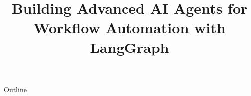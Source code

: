 \documentclass[xcolor=dvipsnames,compress,t,pdf,9pt]{beamer}
\title[\insertframenumber /\inserttotalframenumber]{Building Advanced AI Agents for Workflow Automation with LangGraph}
\begin{document}
	\begin{frame}
	\titlepage
	\end{frame}
	
	\begin{frame}{Outline}
	    \tableofcontents
	\end{frame}

%	
	
	
\end{document}
